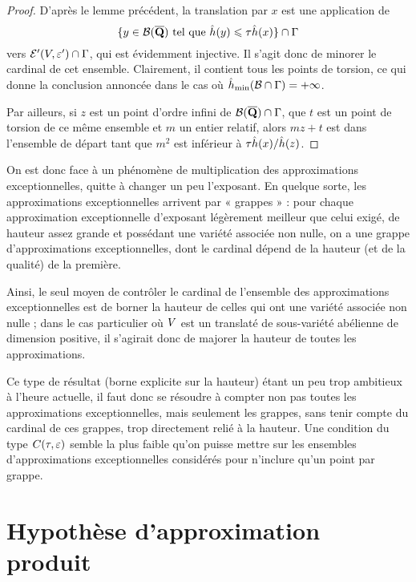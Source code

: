 \begin{proof}
  D'après le lemme précédent, la translation par \( x \) est une application
  de
  \begin{equation}
    \lbrace
      y \in \mathcal B(\overline{{\mathbf{Q}}})
      \text{ tel que }
      \hat h (y) \leqslant \tau \hat h (x)
    \rbrace
    \cap \Gamma
  \end{equation}
  vers \( \mathcal E'(V, \varepsilon') \cap \Gamma \), qui est évidemment injective. Il
  s'agit donc de minorer le cardinal de cet ensemble. Clairement, il contient
  tous les points de torsion, ce qui donne la conclusion annoncée dans le cas
  où \( \hat h_{\mathrm{min}}(\mathcal B \cap \Gamma) = + \infty \).

  Par ailleurs, si \( z \) est un point d'ordre infini de
  \( \mathcal B(\overline{{\mathbf{Q}}}) \cap \Gamma \), que \( t \) est un point de torsion de ce même
  ensemble et \( m \) un entier relatif, alors \( m z + t \) est dans
  l'ensemble de départ tant que \( m^2 \) est inférieur à
  \( \tau \hat h (x) / \hat h (z) \).
\end{proof}

On est donc face à un phénomène de multiplication des approximations
exceptionnelles, quitte à changer un peu l'exposant. En quelque sorte, les
approximations exceptionnelles arrivent par « grappes » : pour chaque
approximation exceptionnelle d'exposant légèrement meilleur que celui exigé,
de hauteur assez grande et possédant une variété associée non nulle, on a une
grappe d'approximations exceptionnelles, dont le cardinal dépend de la hauteur
(et de la qualité) de la première.

Ainsi, le seul moyen de contrôler le cardinal de l'ensemble des approximations
exceptionnelles est de borner la hauteur de celles qui ont une variété
associée non nulle ; dans le cas particulier où \( V \) est un translaté
de sous-variété abélienne de dimension positive, il s'agirait donc de majorer
la hauteur de toutes les approximations.

Ce type de résultat (borne explicite sur la hauteur) étant un peu trop
ambitieux à l'heure actuelle, il faut donc se résoudre à compter non pas
toutes les approximations exceptionnelles, mais seulement les grappes, sans
tenir compte du cardinal de ces grappes, trop directement relié à la hauteur.
Une condition du type \( \condi\tau\eps \) semble la plus faible qu'on puisse
mettre sur les ensembles d'approximations exceptionnelles considérés pour
n'inclure qu'un point par grappe.



\section{Hypothèse d'approximation produit}
\label{sec:ha-prod}

